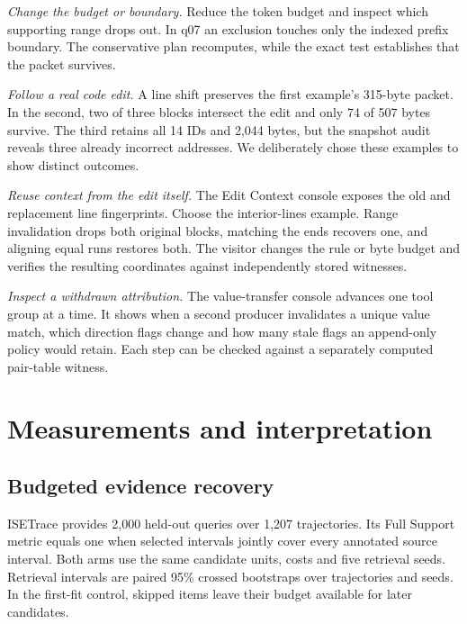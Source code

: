 \documentclass[conference]{IEEEtran}
\begin{document}
\textit{Change the budget or boundary.} Reduce the token budget and inspect which supporting range drops out. In q07 an exclusion touches only the indexed prefix boundary. The conservative plan recomputes, while the exact test establishes that the packet survives.

\textit{Follow a real code edit.} A line shift preserves the first example's 315-byte packet. In the second, two of three blocks intersect the edit and only 74 of 507 bytes survive. The third retains all 14 IDs and 2,044 bytes, but the snapshot audit reveals three already incorrect addresses. We deliberately chose these examples to show distinct outcomes.

\textit{Reuse context from the edit itself.} The Edit Context console exposes the old and replacement line fingerprints. Choose the interior-lines example. Range invalidation drops both original blocks, matching the ends recovers one, and aligning equal runs restores both. The visitor changes the rule or byte budget and verifies the resulting coordinates against independently stored witnesses.

\textit{Inspect a withdrawn attribution.} The value-transfer console advances one tool group at a time. It shows when a second producer invalidates a unique value match, which direction flags change and how many stale flags an append-only policy would retain. Each step can be checked against a separately computed pair-table witness.

\section{Measurements and interpretation}
\subsection{Budgeted evidence recovery}
ISETrace provides 2,000 held-out queries over 1,207 trajectories. Its Full Support metric equals one when selected intervals jointly cover every annotated source interval. Both arms use the same candidate units, costs and five retrieval seeds. Retrieval intervals are paired 95\% crossed bootstraps over trajectories and seeds. In the first-fit control, skipped items leave their budget available for later candidates.
\end{document}
